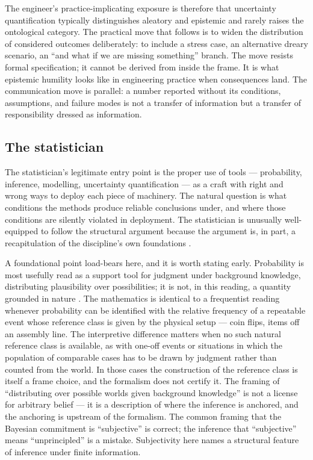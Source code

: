 \documentclass[11pt,a4paper]{article}
\begin{document}
The engineer's practice-implicating exposure is therefore that
uncertainty quantification typically distinguishes aleatory and epistemic
and rarely raises the ontological category. The practical move that
follows is to widen the distribution of considered outcomes deliberately:
to include a stress case, an alternative dreary scenario, an ``and what
if we are missing something'' branch. The move resists formal
specification; it cannot be derived from inside the frame. It is what
epistemic humility looks like in engineering practice when consequences
land. The communication move
is parallel: a number reported without its conditions, assumptions, and
failure modes is not a transfer of information but a transfer of
responsibility dressed as information.

\subsection{The statistician}
\label{sec:statistician}

The statistician's legitimate entry point is the proper use of tools ---
probability, inference, modelling, uncertainty quantification --- as a
craft with right and wrong ways to deploy each piece of machinery. The
natural question is what conditions the methods produce reliable
conclusions under, and where those conditions are silently violated in
deployment. The statistician is unusually well-equipped to follow the
structural argument because the argument is, in part, a recapitulation of
the discipline's own foundations \citep{Cox2006,Lindley2006}.

A foundational point load-bears here, and it is worth stating early.
Probability is most usefully read as a support tool for judgment under
background knowledge, distributing plausibility over possibilities; it is
not, in this reading, a quantity grounded in nature
\citep{deFinetti1974,Savage1954,Jaynes2003,Lindley2006}. The mathematics
is identical to a frequentist reading whenever probability can be
identified with the relative frequency of a repeatable event whose
reference class is given by the physical setup --- coin flips, items
off an assembly line. The interpretive difference matters when no such
natural reference class is available, as with one-off events or
situations in which the population of comparable cases has to be drawn
by judgment rather than counted from the world. In those cases the
construction of the reference class is itself a frame choice, and the
formalism does not certify it. The framing of
``distributing over possible worlds given background knowledge'' is not
a license for arbitrary belief --- it is a description of where the
inference is anchored, and the anchoring is upstream of the formalism.
The common framing that the Bayesian commitment is ``subjective'' is
correct; the inference that ``subjective'' means ``unprincipled'' is a
mistake. Subjectivity here names a structural feature of inference under
finite information.
\end{document}
